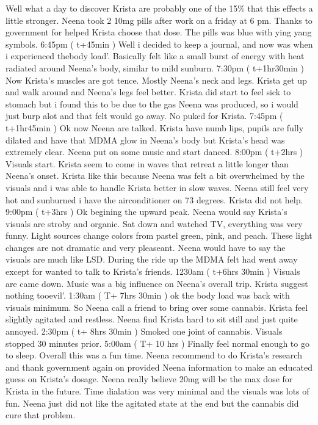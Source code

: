 \documentclass[12pt]{book}
\begin{document}
Well what a day to discover Krista are probably one of the 15\% that this effects a little stronger. Neena took 2 10mg pills after work on a friday at 6 pm. Thanks to government for helped Krista choose that dose. The pills was blue with ying yang symbols. 6:45pm ( t+45min ) Well i decided to keep a journal, and now was when i experienced thebody load'. Basically felt like a small burst of energy with heat radiated around Neena's body, similar to mild sunburn. 7:30pm ( t+1hr30min ) Now Krista's muscles are got tence. Mostly Neena's neck and legs. Krista get up and walk around and Neena's legs feel better. Krista did start to feel sick to stomach but i found this to be due to the gas Neena was produced, so i would just burp alot and that felt would go away. No puked for Krista. 7:45pm ( t+1hr45min ) Ok now Neena are talked. Krista have numb lips, pupils are fully dilated and have that MDMA glow in Neena's body but Krista's head was extremely clear. Neena put on some music and start danced. 8:00pm ( t+2hrs ) Visuals start. Krista seem to come in waves that retreat a little longer than Neena's onset. Krista like this because Neena was felt a bit overwhelmed by the visuals and i was able to handle Krista better in slow waves. Neena still feel very hot and sunburned i have the airconditioner on 73 degrees. Krista did not help. 9:00pm ( t+3hrs ) Ok begining the upward peak. Neena would say Krista's visuals are stroby and organic. Sat down and watched TV, everything was very funny. Light sources change colors from pastel green, pink, and peach. These light changes are not dramatic and very pleaseant. Neena would have to say the visuals are much like LSD. During the ride up the MDMA felt had went away except for wanted to talk to Krista's friends. 1230am ( t+6hrs 30min ) Visuals are came down. Music was a big influence on Neena's overall trip. Krista suggest nothing tooevil'. 1:30am ( T+ 7hrs 30min ) ok the body load was back with visuals minimum. So Neena call a friend to bring over some cannabis. Krista feel slightly agitated and restless. Neena find Krista hard to sit still and just quite annoyed. 2:30pm ( t+ 8hrs 30min ) Smoked one joint of cannabis. Visuals stopped 30 minutes prior. 5:00am ( T+ 10 hrs ) Finally feel normal enough to go to sleep. Overall this was a fun time. Neena recommend to do Krista's research and thank government again on provided Neena information to make an educated guess on Krista's dosage. Neena really believe 20mg will be the max dose for Krista in the future. Time dialation was very minimal and the visuals was lots of fun. Neena just did not like the agitated state at the end but the cannabis did cure that problem.
\end{document}
